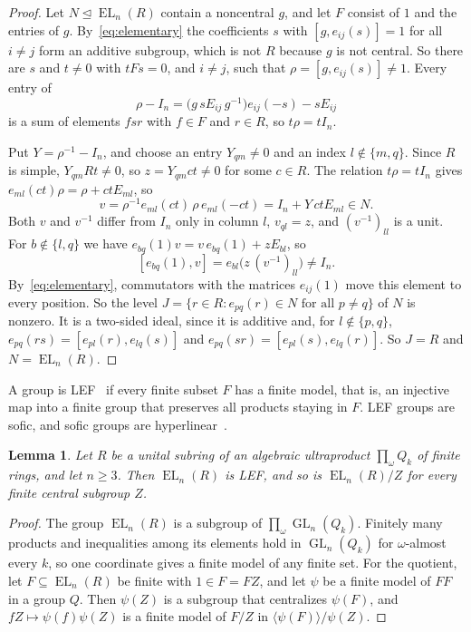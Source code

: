 \documentclass[11pt]{amsart}
\newtheorem{lemma}[theorem]{Lemma}
\newcommand{\EL}{\operatorname{EL}}
\newcommand{\GL}{\operatorname{GL}}
\begin{document}
\begin{proof}
Let $N\trianglelefteq\EL_n(R)$ contain a noncentral $g$, and let $F$
consist of $1$ and the entries of $g$. By~\eqref{eq:elementary} the
coefficients $s$ with $[g,e_{ij}(s)]=1$ for all $i\ne j$ form an additive
subgroup, which is not $R$ because $g$ is not central. So there are $s$
and $t\ne0$ with $tFs=0$, and $i\ne j$, such that $\rho=[g,e_{ij}(s)]\ne1$.
Every entry of
\[
 \rho-I_n=\bigl(g\,sE_{ij}\,g^{-1}\bigr)e_{ij}(-s)-sE_{ij}
\]
is a sum of elements $fsr$ with $f\in F$ and $r\in R$, so $t\rho=tI_n$.

Put $Y=\rho^{-1}-I_n$, and choose an entry $Y_{qm}\ne0$ and an index
$l\notin\{m,q\}$. Since $R$ is simple, $Y_{qm}Rt\ne0$, so $z=Y_{qm}ct\ne0$
for some $c\in R$. The relation $t\rho=tI_n$ gives
$e_{ml}(ct)\rho=\rho+ctE_{ml}$, so
\[
 v=\rho^{-1}e_{ml}(ct)\,\rho\,e_{ml}(-ct)=I_n+Y\,ctE_{ml}\in N.
\]
Both $v$ and $v^{-1}$ differ from $I_n$ only in column $l$, $v_{ql}=z$,
and $(v^{-1})_{ll}$ is a unit. For $b\notin\{l,q\}$ we have
$e_{bq}(1)v=v\,e_{bq}(1)+zE_{bl}$, so
\[
 [e_{bq}(1),v]=e_{bl}\bigl(z\,(v^{-1})_{ll}\bigr)\ne I_n.
\]
By~\eqref{eq:elementary}, commutators with the matrices $e_{ij}(1)$ move
this element to every position. So the level
$J=\{r\in R:e_{pq}(r)\in N\text{ for all }p\ne q\}$ of $N$ is nonzero. It
is a two-sided ideal, since it is additive and, for $l\notin\{p,q\}$,
$e_{pq}(rs)=[e_{pl}(r),e_{lq}(s)]$ and $e_{pq}(sr)=[e_{pl}(s),e_{lq}(r)]$.
So $J=R$ and $N=\EL_n(R)$.
\end{proof}

A group is LEF~\cite{VershikGordon} if every finite subset $F$ has a
finite model, that is, an injective map into a finite group that
preserves all products staying in $F$. LEF groups are sofic, and sofic
groups are hyperlinear~\cite[Example~4.5 and Theorem~3.3]{Pestov}.

\begin{lemma}\label{lem:lef}
Let $R$ be a unital subring of an algebraic ultraproduct
$\prod_\omega Q_k$ of finite rings, and let $n\ge3$. Then $\EL_n(R)$ is
LEF, and so is $\EL_n(R)/Z$ for every finite central subgroup $Z$.
\end{lemma}

\begin{proof}
The group $\EL_n(R)$ is a subgroup of $\prod_\omega\GL_n(Q_k)$. Finitely
many products and inequalities among its elements hold in $\GL_n(Q_k)$
for $\omega$-almost every $k$, so one coordinate gives a finite model of
any finite set. For the quotient, let $F\subseteq\EL_n(R)$ be finite with
$1\in F=FZ$, and let $\psi$ be a finite model of $FF$ in a group $Q$.
Then $\psi(Z)$ is a subgroup that centralizes $\psi(F)$, and
$fZ\mapsto\psi(f)\psi(Z)$ is a finite model of $F/Z$ in
$\langle\psi(F)\rangle/\psi(Z)$.
\end{proof}
\end{document}
